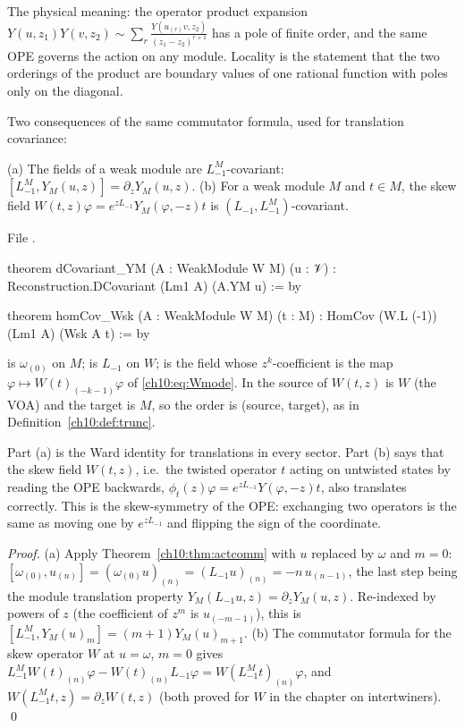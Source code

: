 \begin{remark}
The physical meaning: the operator product expansion
$Y(u,z_1)Y(v,z_2)\sim\sum_r\frac{Y(u_{(r)}v,z_2)}{(z_1-z_2)^{r+1}}$ has a pole of finite order,
and the same OPE governs the action on any module.  Locality is the statement that the two
orderings of the product are boundary values of one rational function with poles only on the
diagonal.
\end{remark}

Two consequences of the same commutator formula, used for translation covariance:

\begin{proposition}\label{ch10:prop:covYM}
(a) The fields of a weak module are $L^M_{-1}$-covariant:
$[L^M_{-1},Y_M(u,z)]=\partial_zY_M(u,z)$.
(b) For a weak module $M$ and $t\in M$, the skew field $W(t,z)\varphi=e^{zL_{-1}}Y_M(\varphi,-z)t$
is $(L_{-1},L^M_{-1})$-covariant.
\end{proposition}
\noindent File .
\begin{leancode}
theorem dCovariant_YM (A : WeakModule W M) (u : 𝒱) :
    Reconstruction.DCovariant (Lm1 A) (A.YM u) := by

theorem homCov_Wsk (A : WeakModule W M) (t : M) : HomCov (W.L (-1)) (Lm1 A) (Wsk A t) := by
\end{leancode}
\begin{dictionary}
 is $\omega_{(0)}$ on $M$;  is $L_{-1}$ on $W$;  is the
field whose $z^k$-coefficient is the map $\varphi\mapsto W(t)_{(-k-1)}\varphi$ of
\eqref{ch10:eq:Wmode}.  In  the source of $W(t,z)$ is $W$ (the VOA) and the target
is $M$, so the order  is (source, target), as in
Definition~\ref{ch10:def:trunc}.
\end{dictionary}

\begin{physics}
Part (a) is the Ward identity for translations in every sector. Part (b) says that the skew field $W(t,z)$, i.e.\ the twisted operator $t$ acting on untwisted states by reading the OPE backwards, $\phi_t(z)\varphi=e^{zL_{-1}}Y(\varphi,-z)t$, also translates correctly. This is the skew-symmetry of the OPE: exchanging two operators is the same as moving one by $e^{zL_{-1}}$ and flipping the sign of the coordinate.
\end{physics}

\emph{Proof.} (a) Apply Theorem~\ref{ch10:thm:actcomm} with $u$ replaced by $\omega$ and $m=0$:
$[\omega_{(0)},u_{(n)}]=(\omega_{(0)}u)_{(n)}=(L_{-1}u)_{(n)}=-n\,u_{(n-1)}$, the last step
being the module translation property $Y_M(L_{-1}u,z)=\partial_zY_M(u,z)$.  Re-indexed by
powers of $z$ (the coefficient of $z^m$ is $u_{(-m-1)}$), this is $[L^M_{-1},Y_M(u)_m]=(m+1)Y_M(u)_{m+1}$.  (b) The commutator formula for the skew operator $W$ at $u=\omega$, $m=0$ gives
$L^M_{-1}W(t)_{(n)}\varphi-W(t)_{(n)}L_{-1}\varphi=W(L^M_{-1}t)_{(n)}\varphi$, and
$W(L_{-1}^Mt,z)=\partial_zW(t,z)$ (both proved for $W$ in the chapter on intertwiners). \qed

